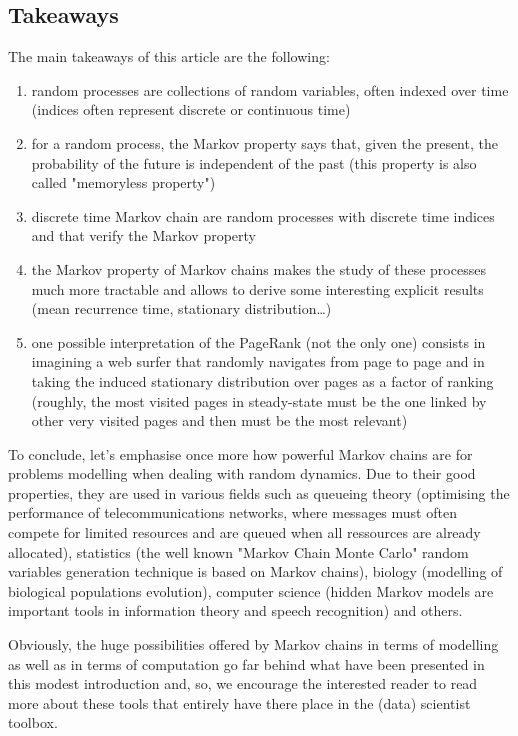 \subsection{Takeaways}

The main takeaways of this article are the following:
\begin{enumerate}

\item random processes are collections of random variables, often indexed over time (indices often represent discrete or continuous time)

\item for a random process, the Markov property says that, given the present, the probability of the future is independent of the past (this property is also called "memoryless property")

\item discrete time Markov chain are random processes with discrete time indices and that verify the Markov property

\item the Markov property of Markov chains makes the study of these processes much more tractable and allows to derive some interesting explicit results (mean recurrence time, stationary distribution…)

\item one possible interpretation of the PageRank (not the only one) consists in imagining a web surfer that randomly navigates from page to page and in taking the induced stationary distribution over pages as a factor of ranking (roughly, the most visited pages in steady-state must be the one linked by other very visited pages and then must be the most relevant)
\end{enumerate}

To conclude, let's emphasise once more how powerful Markov chains are for problems modelling when dealing with random dynamics. Due to their good properties, they are used in various fields such as queueing theory (optimising the performance of telecommunications networks, where messages must often compete for limited resources and are queued when all ressources are already allocated), statistics (the well known "Markov Chain Monte Carlo" random variables generation technique is based on Markov chains), biology (modelling of biological populations evolution), computer science (hidden Markov models are important tools in information theory and speech recognition) and others.

Obviously, the huge possibilities offered by Markov chains in terms of modelling as well as in terms of computation go far behind what have been presented in this modest introduction and, so, we encourage the interested reader to read more about these tools that entirely have there place in the (data) scientist toolbox.

